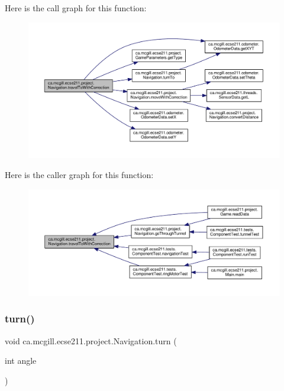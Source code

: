 Here is the call graph for this function\+:
\nopagebreak
\begin{figure}[H]
\begin{center}
\leavevmode
\includegraphics[width=350pt]{classca_1_1mcgill_1_1ecse211_1_1project_1_1_navigation_ae7230e905494002087416294f12cae6a_cgraph}
\end{center}
\end{figure}
Here is the caller graph for this function\+:
\nopagebreak
\begin{figure}[H]
\begin{center}
\leavevmode
\includegraphics[width=350pt]{classca_1_1mcgill_1_1ecse211_1_1project_1_1_navigation_ae7230e905494002087416294f12cae6a_icgraph}
\end{center}
\end{figure}
\mbox{\label{classca_1_1mcgill_1_1ecse211_1_1project_1_1_navigation_ad74286ad36d333bfaf57661837457b76}} 
\subsubsection{\texorpdfstring{turn()}{turn()}}
{\footnotesize\ttfamily void ca.\+mcgill.\+ecse211.\+project.\+Navigation.\+turn (\begin{DoxyParamCaption}\item[{int}]{angle }\end{DoxyParamCaption})}

